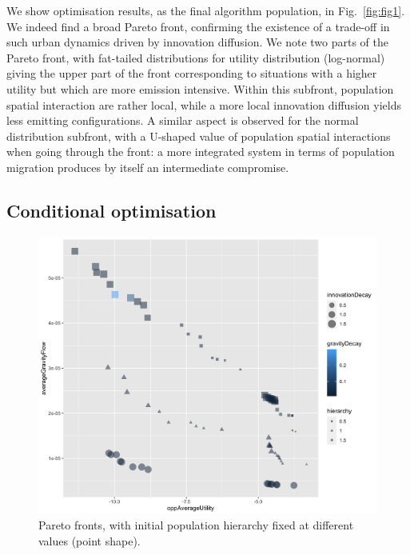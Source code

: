 \documentclass[final,5p,times,twocolumn,authoryear]{elsarticle}
\begin{document}
We show optimisation results, as the final algorithm population, in Fig.~\ref{fig:fig1}. We indeed find a broad Pareto front, confirming the existence of a trade-off in such urban dynamics driven by innovation diffusion. We note two parts of the Pareto front, with fat-tailed distributions for utility distribution (log-normal) giving the upper part of the front corresponding to situations with a higher utility but which are more emission intensive. Within this subfront, population spatial interaction are rather local, while a more local innovation diffusion yields less emitting configurations. A similar aspect is observed for the normal distribution subfront, with a U-shaped value of population spatial interactions when going through the front: a more integrated system in terms of population migration produces by itself an intermediate compromise.






\subsection{Conditional optimisation}




\begin{figure}
	\centering
	\includegraphics[width=\linewidth]{figures/pareto-oppAverageUtility-averageGravityFlow_VARYINGHIERARCHY_color-gravityDecay_size-innovationDecay.png}
	\caption{Pareto fronts, with initial population hierarchy fixed at different values (point shape).\label{fig:fig2}}
\end{figure}
\end{document}
